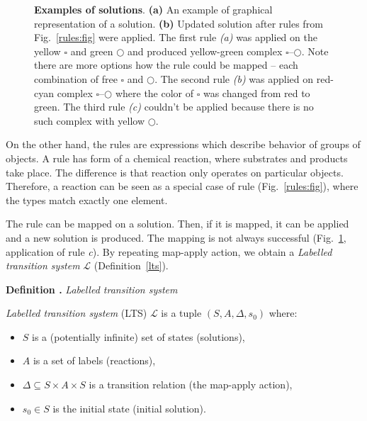 \documentclass[12pt]{fithesis2}
\newcounter{counter}[section]
\renewcommand{\thecounter}{\thesection.\arabic{counter}}
\newenvironment{definition}[1]{\bigskip\refstepcounter{counter}\noindent\textbf{Definition \thecounter } \textit{#1} \par\nopagebreak}{\bigskip}
\begin{document}
\begin{figure}[!h]
\begin{center}
\caption{\textbf{Examples of solutions}. \textbf{(a)} An example of graphical representation of a solution. \textbf{(b)} Updated solution after rules from Fig.~\ref{rules:fig} were applied. The first rule \textit{(a)} was applied on the yellow $\square$ and green $\bigcirc$ and produced yellow-green complex $\square$--$\bigcirc$. Note there are more options how the rule could be mapped -- each combination of free $\square$ and $\bigcirc$. The second rule \textit{(b)} was applied on red-cyan complex $\square$--$\bigcirc$ where the color of $\square$ was changed from red to green. The third rule \textit{(c)} couldn't be applied because there is no such complex with yellow $\bigcirc$. }
\label{solutions:fig}
\end{center}
\end{figure}

On the other hand, the rules are expressions which describe behavior of groups of objects. A rule has form of a chemical reaction, where substrates and products take place. The difference is that reaction only operates on particular objects. Therefore, a reaction can be seen as a special case of rule (Fig.~\ref{rules:fig}), where the types match exactly one element.

The rule can be mapped on a solution. Then, if it is mapped, it can be applied and a new solution is produced. The mapping is not always successful (Fig.~\ref{solutions:fig}, application of rule \textit{c}). By repeating map-apply action, we obtain a \textit{Labelled transition system} $\mathcal{L}$ (Definition~\ref{lts}).

\begin{definition}{Labelled transition system}\label{lts}
\textit{Labelled transition system} (LTS) $\mathcal{L}$ is a tuple $(S, A, \Delta, s_0)$ where:

\begin{itemize}
  \item $S$ is a (potentially infinite) set of states (solutions),
  \item $A$ is a set of labels (reactions),
  \item $\Delta \subseteq S \times A \times S$ is a transition relation (the map-apply action),
  \item $s_0 \in S$ is the initial state (initial solution).
\end{itemize}
\end{definition}
\end{document}
